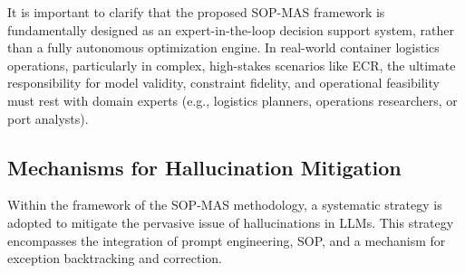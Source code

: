 \documentclass[preprint,12pt]{elsarticle}
\begin{document}
It is important to clarify that the proposed SOP-MAS framework is fundamentally designed as an expert-in-the-loop decision support system, rather than a fully autonomous optimization engine. In real-world container logistics operations, particularly in complex, high-stakes scenarios like ECR, the ultimate responsibility for model validity, constraint fidelity, and operational feasibility must rest with domain experts (e.g., logistics planners, operations researchers, or port analysts).

\subsection{Mechanisms for Hallucination Mitigation}

Within the framework of the SOP-MAS methodology, a systematic strategy is adopted to mitigate the pervasive issue of hallucinations in LLMs. This strategy encompasses the integration of prompt engineering, SOP, and a mechanism for exception backtracking and correction.
\end{document}
